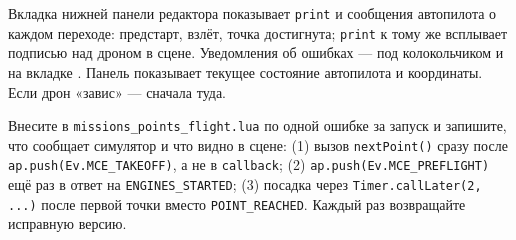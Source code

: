 \begin{hintbox}
Вкладка  нижней панели редактора показывает \verb|print| и сообщения автопилота о каждом переходе: предстарт, взлёт, точка достигнута; \verb|print| к тому же всплывает подписью над дроном в сцене. Уведомления об ошибках --- под колокольчиком и на вкладке . Панель  показывает текущее состояние автопилота и координаты. Если дрон «завис» --- сначала туда.
\end{hintbox}

\begin{taskbox}
Внесите в \texttt{missions\_points\_flight.lua} по одной ошибке за запуск и запишите, что сообщает симулятор и что видно в сцене: (1) вызов \verb|nextPoint()| сразу после \verb|ap.push(Ev.MCE_TAKEOFF)|, а не в \verb|callback|; (2) \verb|ap.push(Ev.MCE_PREFLIGHT)| ещё раз в ответ на \verb|ENGINES_STARTED|; (3) посадка через \verb|Timer.callLater(2, ...)| после первой точки вместо \verb|POINT_REACHED|. Каждый раз возвращайте исправную версию.
\end{taskbox}
